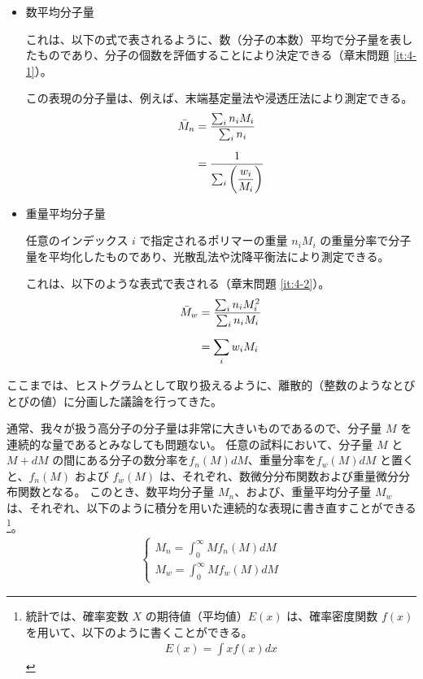 \documentclass[uplatex,dvipdfmx,a4paper,11pt, titlepage]{jsarticle}
\begin{document}
\begin{itemize}
\item
数平均分子量

これは、以下の式で表されるように、数（分子の本数）平均で分子量を表したものであり、分子の個数を評価することにより決定できる（章末問題 \ref{it:4-1}）。

この表現の分子量は、例えば、末端基定量法や浸透圧法により測定できる。
\begin{align}
{\bar M}_n 
	&= \dfrac{\sum_i n_i M_i}{\sum_i n_i} \notag \\[6pt]
	&= \dfrac{1}{\sum_i \left(\dfrac{w_i}{M_i} \right)}
\label{eq:Mn}
\end{align}

\item
重量平均分子量

任意のインデックス $i$ で指定されるポリマーの重量 $n_i M_i$ の重量分率で分子量を平均化したものであり、光散乱法や沈降平衡法により測定できる。

これは、以下のような表式で表される（章末問題 \ref{it:4-2}）。
\begin{align}
{\bar M}_w 
	&= \dfrac{\sum_i n_i M_i^2}{\sum_i n_i M_i}\notag \\[6pt]
	&= \displaystyle \sum_i w_i M_i
\label{eq:Mw}
\end{align}

\end{itemize}

ここまでは、ヒストグラムとして取り扱えるように、離散的（整数のようなとびとびの値）に分画した議論を行ってきた。

通常、我々が扱う高分子の分子量は非常に大きいものであるので、分子量 $M$ を連続的な量であるとみなしても問題ない。
任意の試料において、分子量 $M$ と $M+dM$ の間にある分子の数分率を$f_n(M)dM$、重量分率を$f_w(M)dM$ と置くと、$f_n(M)$ および $f_w(M)$ は、それぞれ、数微分分布関数および重量微分分布関数となる。
このとき、数平均分子量 $M_n$、および、重量平均分子量 $M_w$ は、それぞれ、以下のように積分を用いた連続的な表現に書き直すことができる
\footnote
{
統計では、確率変数 $X$ の期待値（平均値）$E(x)$ は、確率密度関数 $f(x)$ を用いて、以下のように書くことができる。
\begin{align*}
E(x) = \displaystyle \int x f(x) dx
\end{align*}
}。
\begin{align}
\begin{cases}
M_n = \displaystyle\int_0^{\infty} M f_n (M)dM \\[10pt]
M_w = \displaystyle\int_0^{\infty} M f_w (M)dM
\end{cases}
\end{align}
\end{document}
